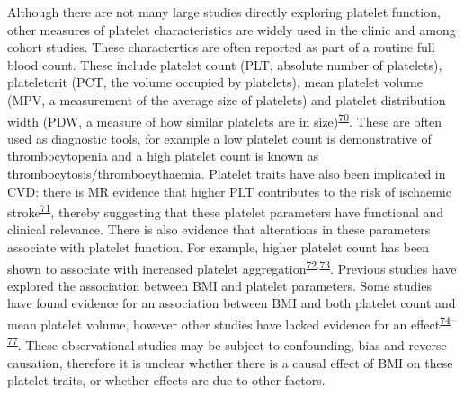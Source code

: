 \documentclass[11pt,twoside]{bristolthesis}
\begin{document}
Although there are not many large studies directly exploring platelet function, other measures of platelet characteristics are widely used in the clinic and among cohort studies. These charactertics are often reported as part of a routine full blood count. These include platelet count (PLT, absolute number of platelets), plateletcrit (PCT, the volume occupied by platelets), mean platelet volume (MPV, a measurement of the average size of platelets) and platelet distribution width (PDW, a measure of how similar platelets are in size)\textsuperscript{\protect\hyperlink{ref-Budak2016}{70}}. These are often used as diagnostic tools, for example a low platelet count is demonstrative of thrombocytopenia and a high platelet count is known as thrombocytosis/thrombocythaemia. Platelet traits have also been implicated in CVD: there is MR evidence that higher PLT contributes to the risk of ischaemic stroke\textsuperscript{\protect\hyperlink{ref-Gill2018}{71}}, thereby suggesting that these platelet parameters have functional and clinical relevance. There is also evidence that alterations in these parameters associate with platelet function. For example, higher platelet count has been shown to associate with increased platelet aggregation\textsuperscript{\protect\hyperlink{ref-Wurtz2012}{72},\protect\hyperlink{ref-Femia2013}{73}}. Previous studies have explored the association between BMI and platelet parameters. Some studies have found evidence for an association between BMI and both platelet count and mean platelet volume, however other studies have lacked evidence for an effect\textsuperscript{\protect\hyperlink{ref-Furuncuoglu2016}{74}--\protect\hyperlink{ref-Heffron2018}{77}}. These observational studies may be subject to confounding, bias and reverse causation, therefore it is unclear whether there is a causal effect of BMI on these platelet traits, or whether effects are due to other factors.
\end{document}

